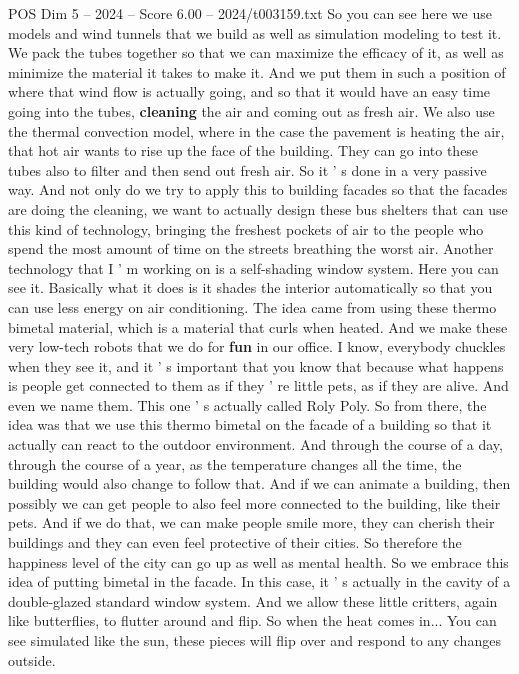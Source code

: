 \begin{textsample}{POS Dim 5 – 2024 – Score 6.00 – 2024/t003159.txt}
So you can see here we use models and wind tunnels that we build as well as simulation modeling to test it.
We pack the tubes together so that we can maximize the efficacy of it, as well as minimize the material it takes to make it.
And we put them in such a position of where that wind flow is actually going, and so that it would have an easy time going into the tubes, \textbf{cleaning} the air and coming out as fresh air.
We also use the thermal convection model, where in the case the pavement is heating the air, that hot air wants to rise up the face of the building.
They can go into these tubes also to filter and then send out fresh air.
So it ' s done in a very passive way.
And not only do we try to apply this to building facades so that the facades are doing the cleaning, we want to actually design these bus shelters that can use this kind of technology, bringing the freshest pockets of air to the people who spend the most amount of time on the streets breathing the worst air.
Another technology that I ' m working on is a self-shading window system.
Here you can see it.
Basically what it does is it shades the interior automatically so that you can use less energy on air conditioning.
The idea came from using these thermo bimetal material, which is a material that curls when heated.
And we make these very low-tech robots that we do for \textbf{fun} in our office.
I know, everybody chuckles when they see it, and it ' s important that you know that because what happens is people get connected to them as if they ' re little pets, as if they are alive.
And even we name them.
This one ' s actually called Roly Poly.
So from there, the idea was that we use this thermo bimetal on the facade of a building so that it actually can react to the outdoor environment.
And through the course of a day, through the course of a year, as the temperature changes all the time, the building would also change to follow that.
And if we can animate a building, then possibly we can get people to also feel more connected to the building, like their pets.
And if we do that, we can make people smile more, they can cherish their buildings and they can even feel protective of their cities.
So therefore the happiness level of the city can go up as well as mental health.
So we embrace this idea of putting bimetal in the facade.
In this case, it ' s actually in the cavity of a double-glazed standard window system.
And we allow these little critters, again like butterflies, to flutter around and flip.
So when the heat comes in...
You can see simulated like the sun, these pieces will flip over and respond to any changes outside.

\end{textsample}
